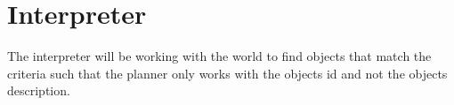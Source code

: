 \section*{Interpreter}
The interpreter will be working with the world to find objects that match the
criteria such that the planner only works with the objects id and not the
objects description.

